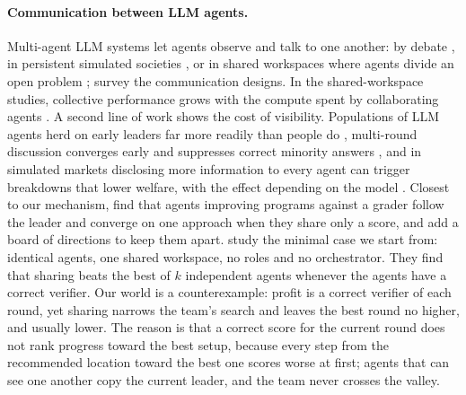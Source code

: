 \paragraph{Communication between LLM agents.}
Multi-agent LLM systems let agents observe and talk to one another: by debate \citep{du2023improving}, in
persistent simulated societies \citep{park2023generative}, or in shared workspaces where agents divide an open
problem \citep{qu2026coral,shen2026swecraft}; \citet{yan2025beyond} survey the communication designs. In the
shared-workspace studies, collective performance grows with the compute spent by collaborating agents
\citep{park2026scaling,shen2026swecraft}. A second line of work shows the cost of visibility. Populations of
LLM agents herd on early leaders far more readily than people do \citep{hashemi2026herding}, multi-round
discussion converges early and suppresses correct minority answers \citep{pitre2026failures}, and in simulated
markets disclosing more information to every agent can trigger breakdowns that lower welfare, with the effect
depending on the model \citep{erdogan2026who}. Closest to our mechanism, \citet{ren2026coral} find that agents
improving programs against a grader follow the leader and converge on one approach when they share only a
score, and add a board of directions to keep them apart. \citet{park2026scaling} study the minimal case we
start from: identical agents, one shared workspace, no roles
and no orchestrator. They find that sharing beats the best of $k$ independent agents whenever the agents have a correct verifier.
Our world is a counterexample: profit is a correct verifier of each round, yet sharing narrows the team's search
and leaves the best round no higher, and usually lower. The reason is that a correct score for the current
round does not rank progress toward the best setup, because every step from the recommended location toward
the best one scores worse at first; agents that can see one another copy the current leader, and the team
never crosses the valley.
